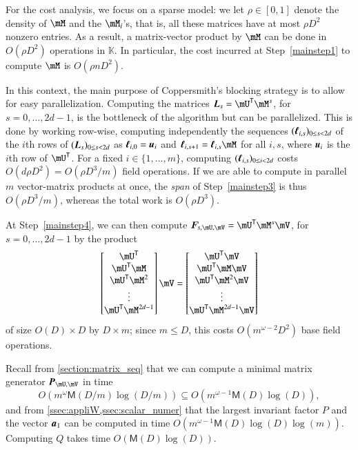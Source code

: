 \documentclass[final,1p,times,authoryear]{elsarticle}
\newcommand{\mat}[1]{\bm{\MakeUppercase{#1}}} %
\newcommand{\row}[1]{\bm{\MakeLowercase{#1}}} %
\newcommand{\seqelt}[1]{\bm{F}_{#1}} %
\newcommand{\sqfree}{Q}
\newcommand{\trsp}[1]{#1^{\mathsf{T}}} %
\newcommand{\density}{\rho}
\def\M {\ensuremath{\mathsf{M}}}
\def\K{\mathbb{K}}
\def\K {\ensuremath{\mathbb{K}}}
\newcommand{\mUt}{\trsp{\mU}}
\begin{document}
For the cost analysis, we focus on a sparse model: we let $\density
\in [0,1]$ denote the density of $\mM$ and the $\mM_i$'s, that is, all
these matrices have at most $\density D^2$ nonzero entries.  As a
result, a matrix-vector product by $\mM$ can be done in $O(\density
D^2)$ operations in $\K$. In particular, the cost incurred at
Step~\ref{mainstep1} to compute $\mM$ is $O(\density n D^2)$.

In this context, the main purpose of Coppersmith's blocking strategy
is to allow for easy parallelization. Computing the matrices
$\mat{L}_s=\mUt\mM^s$, for $s=0,\dots,2d-1$, is the bottleneck
of the algorithm but can be parallelized. This is done by
working row-wise, computing independently the sequences
$(\row{\ell}_{i,s})_{0 \le s < 2d}$ of the $i$th rows of
$(\mat{L}_s)_{0 \le s < 2d}$ as $\row{\ell}_{i,0}=\row{u}_i$ and
$\row{\ell}_{i,s+1} = \row{\ell}_{i,s}
\mM$ for all $i,s$, where $\row{u}_i$ is the $i$th row of $\mUt$.
For a fixed $i \in \{1,\dots,m\}$, computing $(\mat{\ell}_{i,s})_{0
\le i < 2d}$ costs $O(d \density D^2) = O(\density D^3/m )$ field operations. If
we are able to compute in parallel $m$ vector-matrix products at once,
the {\em span} of Step~\ref{mainstep3} is thus $O(\density D^3/m)$, whereas
the total work is $O(\density D^3)$.

At Step~\ref{mainstep4}, we can then compute $\seqelt{s,\mU,\mV}=\mUt\mM^s\mV$, for $s=0,\dots,2d-1$ by the
product
$$
\begin{bmatrix}
  \mUt\\
  \mUt \mM\\
  \mUt \mM^2\\
  \vdots\\
  \mUt \mM^{2d-1}\\
\end{bmatrix} \mV
= 
\begin{bmatrix}
  \mUt \mV\\
  \mUt \mM \mV\\
  \mUt \mM^2 \mV\\
  \vdots \\
  \mUt \mM^{2d-1} \mV\\
\end{bmatrix}
$$
of size $O(D) \times D$ by $D \times m$; since $m \le D$, this  costs $O(m^{\omega-2}D^2)$
base field operations.

Recall from \cref{section:matrix_seq} that we can compute a minimal
matrix generator $\mat{P}_{\mU,\mV}$ in time
\[
  O(m^{\omega} \M(D/m) \log(D/m)) \subseteq O(m^{\omega-1} \M(D) \log(D)),
\]
and from
\cref{ssec:appliW,ssec:scalar_numer} that the
largest invariant factor $P$ and the vector $\row{a}_1$ can be
computed in time $O(m^{\omega-1} \M(D) \log(D) \log(m))$.  Computing $\sqfree$
takes time $O(\M(D) \log(D))$.
\end{document}

